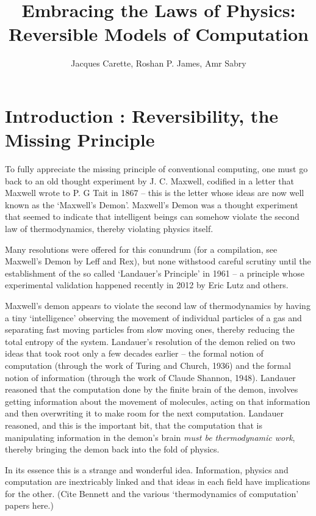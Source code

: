\documentclass{article}
\title{Embracing the Laws of Physics: \\ Reversible Models of Computation}
\author{Jacques Carette, Roshan P. James, Amr Sabry}
\begin{document}
\maketitle

\section{Introduction : Reversibility, the Missing Principle}

To fully appreciate the missing principle of conventional computing,
one must go back to an old thought experiment by J. C. Maxwell,
codified in a letter that Maxwell wrote to P. G Tait in 1867 -- this
is the letter whose ideas are now well known as the `Maxwell's
Demon'. Maxwell's Demon was a thought experiment that seemed to
indicate that intelligent beings can somehow violate the second law of
thermodynamics, thereby violating physics itself.

Many resolutions were offered for this conundrum (for a compilation,
see Maxwell's Demon by Leff and Rex), but none withstood careful
scrutiny until the establishment of the so called `Landauer's
Principle' in 1961 -- a principle whose experimental validation
happened recently in 2012 by Eric Lutz and others.

Maxwell's demon appears to violate the second law of thermodynamics by
having a tiny `intelligence' observing the movement of individual
particles of a gas and separating fast moving particles from slow
moving ones, thereby reducing the total entropy of the
system. Landauer's resolution of the demon relied on two ideas that
took root only a few decades earlier -- the formal notion of
computation (through the work of Turing and Church, 1936) and the
formal notion of information (through the work of Claude Shannon,
1948). Landauer reasoned that the computation done by the finite brain
of the demon, involves getting information about the movement of
molecules, acting on that information and then overwriting it to make
room for the next computation.  Landauer reasoned, and this is the
important bit, that the computation that is manipulating information
in the demon's brain \textit{must be thermodynamic work}, thereby
bringing the demon back into the fold of physics.

In its essence this is a strange and wonderful idea. Information,
physics and computation are inextricably linked and that ideas in each
field have implications for the other. (Cite Bennett and the various
`thermodynamics of computation' papers here.)
\end{document}

